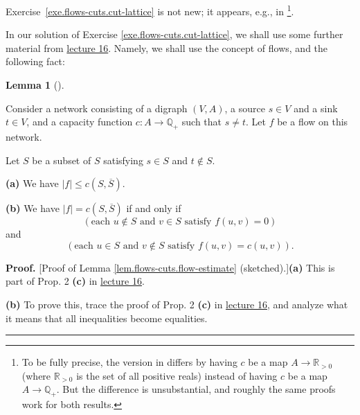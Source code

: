 \documentclass[numbers=enddot,12pt,final,onecolumn,notitlepage]{scrartcl}%
\theoremstyle{definition}
\newtheorem{lem}[theo]{Lemma}
\newenvironment{lemma}[1][]
{\begin{lem}[#1]\begin{leftbar}}
{\end{leftbar}\end{lem}}
\newenvironment{proof}[1][Proof]{\noindent\textbf{#1.} }{\ \rule{0.5em}{0.5em}}
\newcommand{\QQ}{\mathbb{Q}}
\newcommand{\RR}{\mathbb{R}}
\begin{document}
Exercise~\ref{exe.flows-cuts.cut-lattice} is not new;
it appears, e.g., in \cite[Corollary 3]{PicQue80}\footnote{To
  be fully precise, the version in
  \cite[Corollary 3]{PicQue80} differs by having $c$ be
  a map $A \to \RR_{> 0}$ (where $\RR_{> 0}$ is the set of
  all positive reals) instead of having $c$ be a map
  $A \to \QQ_+$. But the difference is unsubstantial,
  and roughly the same proofs work for both results.}.

In our solution of Exercise \ref{exe.flows-cuts.cut-lattice}, we shall use
some further material from
\href{http://www-users.math.umn.edu/~dgrinber/5707s17/5707lec16.pdf}{lecture
16}. Namely, we shall use the concept of flows, and the following fact:

\begin{lemma}
\label{lem.flows-cuts.flow-estimate}Consider a network consisting of a digraph
$\left(  V,A\right)  $, a source $s\in V$ and a sink $t\in V$, and a capacity
function $c:A\rightarrow\mathbb{Q}_{+}$ such that $s\neq t$. Let $f$ be a flow
on this network.

Let $S$ be a subset of $S$ satisfying $s\in S$ and $t\notin S$.

\textbf{(a)} We have $\left\vert f\right\vert \leq c\left(  S,\overline
{S}\right)  $.

\textbf{(b)} We have $\left\vert f\right\vert =c\left(  S,\overline{S}\right)
$ if and only if%
\begin{equation}
\left(  \text{each }u\notin S\text{ and }v\in S\text{ satisfy }f\left(
u,v\right)  =0\right)  \label{eq.lem.flows-cuts.flow-estimate.b.1}%
\end{equation}
and%
\begin{equation}
\left(  \text{each }u\in S\text{ and }v\notin S\text{ satisfy }f\left(
u,v\right)  =c\left(  u,v\right)  \right)  .
\label{eq.lem.flows-cuts.flow-estimate.b.2}%
\end{equation}

\end{lemma}

\begin{proof}
[Proof of Lemma \ref{lem.flows-cuts.flow-estimate} (sketched).]\textbf{(a)}
This is part of Prop. 2 \textbf{(c)} in
\href{http://www-users.math.umn.edu/~dgrinber/5707s17/5707lec16.pdf}{lecture
16}.

\textbf{(b)} To prove this, trace the proof of Prop. 2 \textbf{(c)} in
\href{http://www-users.math.umn.edu/~dgrinber/5707s17/5707lec16.pdf}{lecture
16}, and analyze what it means that all inequalities become equalities.
\end{proof}
\end{document}
